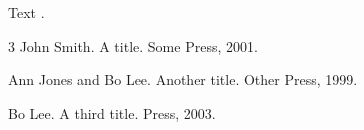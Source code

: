 \documentclass{article}
\begin{document}
Text \citep{a}.

\begin{thebibliography}{3}
John Smith.
\newblock A title.
\newblock Some Press, 2001.

Ann Jones and Bo Lee.
\newblock Another title.
\newblock Other Press, 1999.

Bo Lee.
\newblock A third title.
\newblock Press, 2003.
\end{thebibliography}
\end{document}
